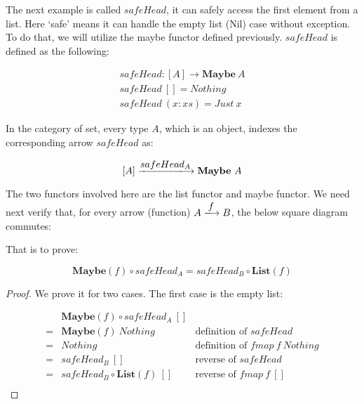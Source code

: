 \documentclass{article}
\begin{document}
\begin{example}
The next example is called $safeHead$, it can safely access the first element from a list. Here `safe' means it can handle the empty list (Nil) case without exception. To do that, we will utilize the maybe functor defined previously. $safeHead$ is defined as the following:

\[
\begin{array}{l}
safeHead : [A] \to \mathbf{Maybe}\ A \\
safeHead\ [] = Nothing \\
safeHead\ (x:xs) = Just\ x
\end{array}
\]

In the category of set, every type $A$, which is an object, indexes the corresponding arrow $safeHead$ as:

\[
[A] \arrowto{safeHead_A} \mathbf{Maybe}\ A
\]

The two functors involved here are the list functor and maybe functor. We need next verify that, for every arrow (function) $A \arrowto{f} B$, the below square diagram commutes:

\begin{center}
\end{center}

That is to prove:

\[
  \mathbf{Maybe}(f) \circ safeHead_A = safeHead_B \circ \mathbf{List}(f)
\]

\begin{proof}
We prove it for two cases. The first case is the empty list:

\[
\begin{array}{cll}
  & \mathbf{Maybe}(f) \circ safeHead_A\ [] & \\
= & \mathbf{Maybe}(f)\ Nothing & \text{definition of $safeHead$} \\
= & Nothing & \text{definition of $fmap\ f\ Nothing$} \\
= & safeHead_B\ [] & \text{reverse of $safeHead$} \\
= & safeHead_B \circ \mathbf{List}(f)\ [] & \text{reverse of $fmap\ f\ []$} \\
\end{array}
\]


\end{proof}
\end{example}
\end{document}
